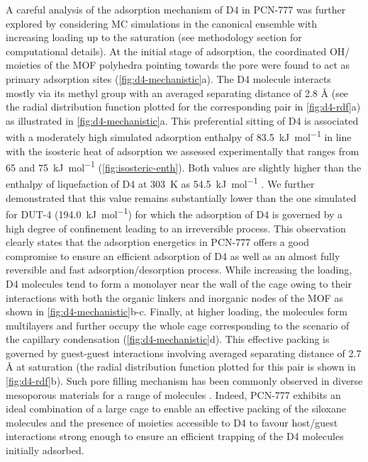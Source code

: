 A careful analysis of the adsorption mechanism of D4 in PCN-777 was further
explored by considering MC simulations in the canonical ensemble with increasing
loading up to the saturation (see methodology section for computational
details). At the initial stage of adsorption, the coordinated OH/
moieties of the MOF  polyhedra pointing towards the pore were found to
act as primary adsorption sites (\cref{fig:d4-mechanistic}a). The D4 molecule
interacts mostly via its methyl group with an averaged separating
 distance of 2.8 Å (see the radial distribution function
plotted for the corresponding pair in \cref{fig:d4-rdf}a) as illustrated in
\cref{fig:d4-mechanistic}a. This preferential sitting of D4 is associated with a
moderately high simulated adsorption enthalpy of \SI{83.5}{\kilo\joule\per\mol}
in line with the isosteric heat of adsorption we assessed experimentally that
ranges from 65 and \SI{75}{\kilo\joule\per\mol} (\cref{fig:isosteric-enth}).
Both values are slightly higher than the enthalpy of liquefaction of D4 at
\SI{303}{\kelvin} as \SI{54.5}{\kilo\joule\per\mol}
\citep{lemmonNISTStandardReference2018}. We further demonstrated that this value
remains substantially lower than the one simulated for DUT-4
(\SI{194.0}{\kilo\joule\per\mol}) for which the adsorption of D4 is governed by
a high degree of confinement leading to an irreversible process. This
observation clearly states that the adsorption energetics in PCN-777 offers a
good compromise to ensure an efficient adsorption of D4 as well as an almost
fully reversible and fast adsorption/desorption process. While increasing the
loading, D4 molecules tend to form a monolayer near the wall of the cage owing
to their interactions with both the organic linkers and inorganic nodes of the
MOF as shown in \cref{fig:d4-mechanistic}b-c. Finally, at higher loading, the
molecules form multilayers and further occupy the whole cage corresponding to
the scenario of the capillary condensation (\cref{fig:d4-mechanistic}d). This
effective packing is governed by guest-guest interactions involving averaged
separating  distance of 2.7 Å at saturation (the radial
distribution function plotted for this pair is shown in \cref{fig:d4-rdf}b).
Such pore filling mechanism has been commonly observed in diverse mesoporous
materials for a range of molecules \citep{rouquerolAdsorptionPowdersPorous2013}.
Indeed, PCN-777 exhibits an ideal combination of a large cage to enable an
effective packing of the siloxane molecules and the presence of moieties
accessible to D4 to favour host/guest interactions strong enough to ensure an
efficient trapping of the D4 molecules initially adsorbed.

